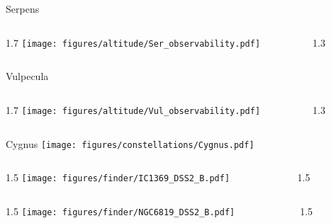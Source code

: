 \documentclass[final]{beamer}
\newlength{\colwidth}
\begin{document}
\begin{frame}[t]{}

    \Large{Serpens}
    \begin{columns}[T]
        \begin{column}{1.7\colwidth}
            \centering
            \texttt{[image: figures/altitude/Ser\_observability.pdf]}
        \end{column}
        \begin{column}{1.3\colwidth}
            \Large
            
        \end{column}
    \end{columns}

    \Large{Vulpecula}
    \begin{columns}[T]
        \begin{column}{1.7\colwidth}
            \centering
            \texttt{[image: figures/altitude/Vul\_observability.pdf]}
        \end{column}
        \begin{column}{1.3\colwidth}
            \Large
            
        \end{column}
    \end{columns}
\end{frame}


\begin{frame}[t]{\LARGE Cygnus}
    \centering
    \texttt{[image: figures/constellations/Cygnus.pdf]}
\end{frame}


\begin{frame}[t]{}
    \begin{columns}[T]
        \begin{column}{1.5\colwidth}
            \centering
            \texttt{[image: figures/finder/IC1369\_DSS2\_B.pdf]}
        \end{column}
        \begin{column}{1.5\colwidth}
            \Large
            
        \end{column}
    \end{columns}
    \vspace{\fill}
    \begin{columns}[T]
        \begin{column}{1.5\colwidth}
            \centering
            \texttt{[image: figures/finder/NGC6819\_DSS2\_B.pdf]}
        \end{column}
        \begin{column}{1.5\colwidth}
            \Large
            
        \end{column}
    \end{columns}
\end{frame}
\end{document}
